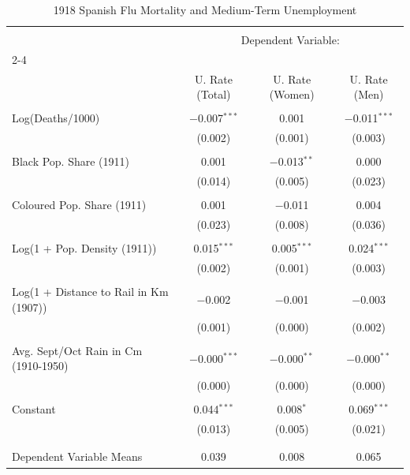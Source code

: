 
\begin{table}[!htbp] \centering 
  \caption{1918 Spanish Flu Mortality and Medium-Term Unemployment} 
  \label{} 
\begin{tabular}{@{\extracolsep{5pt}}lccc} 
\\[-1.8ex]\hline 
\hline \\[-1.8ex] 
 & \multicolumn{3}{c}{Dependent Variable:} \\ 
\cline{2-4} 
\\[-1.8ex] & U. Rate (Total) & U. Rate (Women) & U. Rate (Men) \\ 
\hline \\[-1.8ex] 
 Log(Deaths/1000) & $-$0.007$^{***}$ & 0.001 & $-$0.011$^{***}$ \\ 
  & (0.002) & (0.001) & (0.003) \\ 
  & & & \\ 
 Black Pop. Share  (1911) & 0.001 & $-$0.013$^{**}$ & 0.000 \\ 
  & (0.014) & (0.005) & (0.023) \\ 
  & & & \\ 
 Coloured Pop.  Share  (1911) & 0.001 & $-$0.011 & 0.004 \\ 
  & (0.023) & (0.008) & (0.036) \\ 
  & & & \\ 
 Log(1 + Pop. Density (1911)) & 0.015$^{***}$ & 0.005$^{***}$ & 0.024$^{***}$ \\ 
  & (0.002) & (0.001) & (0.003) \\ 
  & & & \\ 
 Log(1 + Distance to Rail in Km (1907)) & $-$0.002 & $-$0.001 & $-$0.003 \\ 
  & (0.001) & (0.000) & (0.002) \\ 
  & & & \\ 
 Avg. Sept/Oct Rain in Cm (1910-1950) & $-$0.000$^{***}$ & $-$0.000$^{**}$ & $-$0.000$^{**}$ \\ 
  & (0.000) & (0.000) & (0.000) \\ 
  & & & \\ 
 Constant & 0.044$^{***}$ & 0.008$^{*}$ & 0.069$^{***}$ \\ 
  & (0.013) & (0.005) & (0.021) \\ 
  & & & \\ 
\hline \\[-1.8ex] 
Dependent Variable Means & 0.039 & 0.008 & 0.065 \\ 

\end{tabular}
\end{table}
